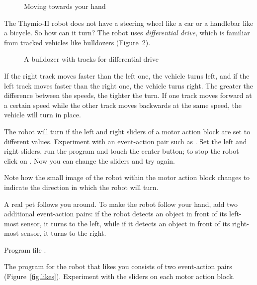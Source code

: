 \begin{figure}
\begin{center}
\caption{Moving towards your hand}\label{fig.follow-hand}
\end{center}
\end{figure}



The Thymio-II robot does not have a steering wheel like a car or a
handlebar like a bicycle. So how can it turn? The robot uses
\emph{differential drive}, which is familiar from tracked vehicles like
bulldozers (Figure~\ref{fig.bull}).

\begin{figure}
\begin{center}
\caption{A bulldozer with tracks for differential drive}\label{fig.bull}
\end{center}
\end{figure}

If the right track moves faster than the left one, the vehicle turns
left, and if the left track moves faster than the right one, the vehicle
turns right. The greater the difference between the speeds, the tighter
the turn. If one track moves forward at a certain speed while the other
track moves backwards at the same speed, the vehicle will turn in place.

The robot will turn if the left and right sliders of a motor action
block are set to different values. Experiment with an event-action pair
such as . Set the left and right sliders, run the program
and touch the center button; to stop the robot click on .
Now you can change the sliders and try again.

Note how the small image of the robot within the motor action block
changes to indicate the direction in which the robot will turn.


A real pet follows you around. To make the robot follow your hand, add
two additional event-action pairs: if the robot detects an object in
front of its left-most sensor, it turns to the left, while if it detects
an object in front of its right-most sensor, it turns to the right.

{\raggedleft \hfill Program file .}

The program for the robot that likes you consists of two event-action
pairs (Figure~\ref{fig.likes}). Experiment with the sliders on each
motor action block.


